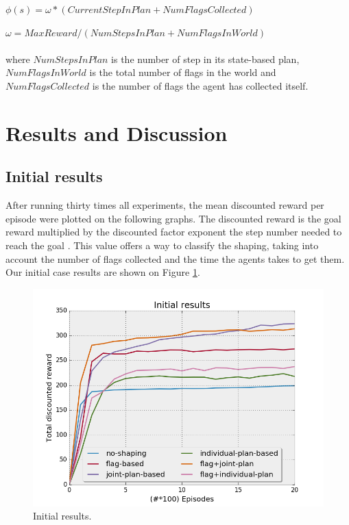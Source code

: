 \documentclass[letterpaper]{article}
\begin{document}
$\phi (s) = \omega * (CurrentStepInPlan + NumFlagsCollected)$

$\omega = MaxReward/(NumStepsInPlan + NumFlagsInWorld)$\\\\
where $NumStepsInPlan$ is the number of step in its state-based plan, $NumFlagsInWorld$ is the total number of flags in the world and $NumFlagsCollected$ is the number of flags the agent has collected itself.

\section{Results and Discussion}
\subsection{Initial results}

After running thirty times all experiments, the mean discounted reward per episode were plotted on the following graphs. The discounted reward is the goal reward multiplied by the discounted factor exponent the step number needed to reach the goal  \citep{SCpbrs}. This value offers a way to classify the shaping, taking into account the number of flags collected and the time the agents takes to get them.\\
 Our initial case results are shown on Figure \ref{fig:results1}. \\

\begin{figure}[h!]
  \includegraphics[width=\linewidth]{img/initial.png}
  \caption{Initial results.}
  \label{fig:results1}
\end{figure}
\end{document}
